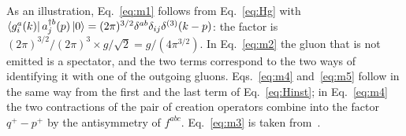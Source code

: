 As an illustration, Eq.~\eqref{eq:m1} follows from Eq.~\eqref{eq:Hg} with $\bra{g^a_i(k)}a^{\dagger b}_j(p)\ket0=(2\pi)^{3/2}\delta^{ab}\delta_{ij}\delta^{(3)}(k-p)$: the factor is $(2\pi)^{3/2}/(2\pi)^3\times g/\sqrt2=g/(4\pi^{3/2})$. In Eq.~\eqref{eq:m2} the gluon that is not emitted is a spectator, and the two terms correspond to the two ways of identifying it with one of the outgoing gluons. Eqs.~\eqref{eq:m4} and~\eqref{eq:m5} follow in the same way from the first and the last term of Eq.~\eqref{eq:Hinst}; in Eq.~\eqref{eq:m4} the two contractions of the pair of creation operators combine into the factor $q^+-p^+$ by the antisymmetry of $f^{abc}$. Eq.~\eqref{eq:m3} is taken from~\cite{Lublinsky:2016meo}.

